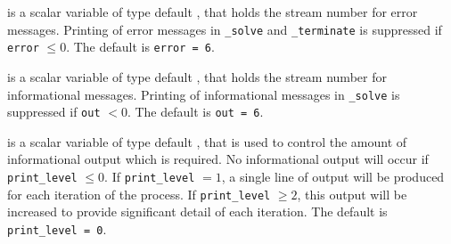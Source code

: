 \begin{description}

 is a scalar variable of type default \integer, that holds the
stream number for error messages. Printing of error messages in
{\tt \packagename\_solve} and {\tt \packagename\_terminate}
is suppressed if {\tt error} $\leq 0$.
The default is {\tt error = 6}.

 is a scalar variable of type default \integer, that holds the
stream number for informational messages. Printing of informational messages in
{\tt \packagename\_solve} is suppressed if {\tt out} $< 0$.
The default is {\tt out = 6}.

 is a scalar variable of type default \integer, that is used
to control the amount of informational output which is required. No
informational output will occur if {\tt print\_level} $\leq 0$. If
{\tt print\_level} $= 1$, a single line of output will be produced for each
iteration of the process. If {\tt print\_level} $\geq 2$, this output will be
increased to provide significant detail of each iteration.
The default is {\tt print\_level = 0}.



\end{description}
